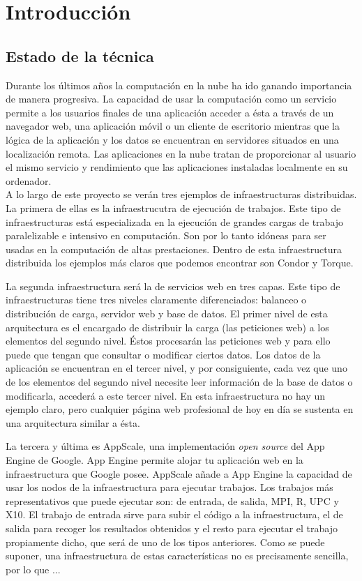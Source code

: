 \chapter{Introducción}
\label{cap:introduccion}


\section{Estado de la técnica}

Durante los últimos años la computación en la nube ha ido ganando importancia de manera progresiva. La capacidad de usar la computación como un servicio permite a los usuarios finales de una aplicación acceder a ésta a través de un navegador web, una aplicación móvil o un cliente de escritorio mientras que la lógica de la aplicación y los datos se encuentran en servidores situados en una localización remota. Las aplicaciones en la nube tratan de proporcionar al usuario el mismo servicio y rendimiento que las aplicaciones instaladas localmente en su ordenador.\\

A lo largo de este proyecto se verán tres ejemplos de infraestructuras distribuidas.
La primera de ellas es la infraestrucutra de ejecución de trabajos. Este tipo de infraestructuras está especializada en la ejecución de grandes cargas de trabajo paralelizable e intensivo en computación. Son por lo tanto idóneas para ser usadas en la computación de altas prestaciones. Dentro de esta infraestructura distribuida los ejemplos más claros que podemos encontrar son Condor y Torque.

La segunda infraestructura será la de servicios web en tres capas. Este tipo de infraestructuras tiene tres niveles claramente diferenciados: balanceo o distribución de carga, servidor web y base de datos. El primer nivel de esta arquitectura es el encargado de distribuir la carga (las peticiones web) a los elementos del segundo nivel. Éstos procesarán las peticiones web y para ello puede que tengan que consultar o modificar ciertos datos. Los datos de la aplicación se encuentran en el tercer nivel, y  por consiguiente, cada vez que uno de los elementos del segundo nivel necesite leer información de la base de datos o modificarla, accederá a este tercer nivel. En esta infraestructura no hay un ejemplo claro, pero cualquier página web profesional de hoy en día se sustenta en una arquitectura similar a ésta.

La tercera y última es AppScale, una implementación \emph{open source} del App Engine de Google. App Engine permite alojar tu aplicación web en la infraestructura que Google posee. AppScale añade a App Engine la capacidad de usar los nodos de la infraestructura para ejecutar trabajos. Los trabajos más representativos que puede ejecutar son: de entrada, de salida, MPI, R, UPC y X10. El trabajo de entrada sirve para subir el código a la infraestructura, el de salida para recoger los resultados obtenidos y el resto para ejecutar el trabajo propiamente dicho, que será de uno de los tipos anteriores. Como se puede suponer, una infraestructura de estas características no es precisamente sencilla, por lo que ...\\

